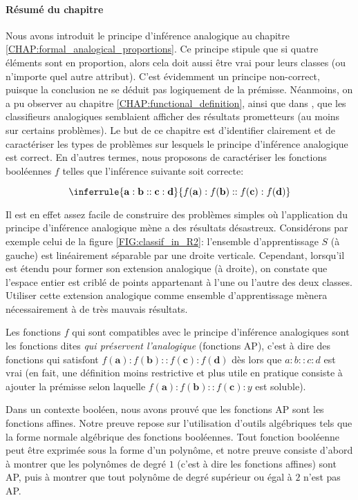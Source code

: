 \paragraph{Résumé du chapitre}

Nous avons introduit le principe d'inférence analogique au chapitre
\ref{CHAP:formal_analogical_proportions}. Ce principe stipule que si quatre
éléments sont en proportion, alors cela doit aussi être vrai pour leurs classes
(ou n'importe quel autre attribut). C'est évidemment un principe non-correct,
puisque la conclusion ne se déduit pas logiquement de la prémisse. Néanmoins,
on a pu observer au chapitre \ref{CHAP:functional_definition}, ainsi que dans
\cite{BayMicDelIJCAI07}, que les classifieurs analogiques semblaient afficher
des résultats prometteurs (au moins sur certains problèmes). Le but de ce
chapitre est d'identifier clairement et de caractériser les types de problèmes
sur lesquels le principe d'inférence analogique est correct. En d'autres
termes, nous proposons de caractériser les fonctions booléennes $f$ telles que
l'inférence suivante soit correcte:

$$
\inferrule{\mathbf{a} : \mathbf{b} :: \mathbf{c} : \mathbf{d}}{ f(\mathbf{a}) :
f(\mathbf{b}) :: f(\mathbf{c}) : f(\mathbf{d})}
$$

Il est en effet assez facile de construire des problèmes simples où
l'application du principe d'inférence analogique mène a des résultats
désastreux. Considérons par exemple celui de la figure \ref{FIG:classif_in_R2}:
l'ensemble d'apprentissage $S$ (à gauche) est linéairement séparable par une
droite verticale. Cependant, lorsqu'il est étendu pour former son extension
analogique (à droite), on constate que l'espace entier est criblé de points
appartenant à l'une ou l'autre des deux classes. Utiliser cette extension
analogique comme ensemble d'apprentissage mènera nécessairement à de très
mauvais résultats.

Les fonctions $f$ qui sont compatibles avec le principe d'inférence analogiques
sont les fonctions dites \textit{qui préservent l'analogique} (fonctions AP),
c'est à dire des fonctions qui satisfont $f(\mathbf{a}) :f(\mathbf{b})::
f(\mathbf{c}): f(\mathbf{d})$  dès lors que $a:b::c:d$ est vrai (en fait, une
définition moins restrictive et plus utile en pratique consiste à ajouter la
prémisse selon laquelle $f(\mathbf{a}) :f(\mathbf{b}):: f(\mathbf{c}):y$ est
soluble).


Dans un contexte booléen, nous avons prouvé que les fonctions AP sont les
fonctions affines. Notre preuve repose sur l'utilisation d'outils algébriques
tels que la forme normale algébrique des fonctions booléennes. Tout fonction
booléenne peut être exprimée sous la forme d'un polynôme, et notre preuve
consiste d'abord  à montrer que les polynômes de degré $1$ (c'est à dire les
fonctions affines) sont AP, puis à montrer que tout polynôme de degré supérieur
ou égal à $2$ n'est pas AP.

